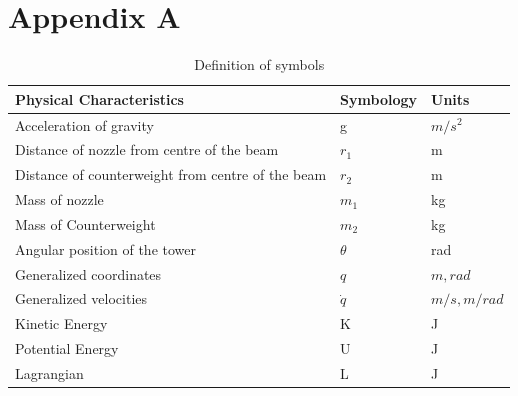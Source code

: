\documentclass{UoNMCHA}
\numberwithin{equation}{section}
\begin{document}
\newpage
\newpage
\appendix

\section{Appendix A}

\begin{table}[H] \label{tab:physical Characteristics}
	\caption{Definition of symbols}
	\begin{tabular}{lll}
		\textbf{Physical Characteristics}                 & \textbf{Symbology} & \textbf{Units}                              \\ \hline
		Acceleration of gravity                           & g                  & $m/s^2 $     \\
		Distance of nozzle from centre of the beam        &$ r_1 $              & m                                           \\
		Distance of counterweight from centre of the beam & $r_2$               & m                                           \\
		Mass of nozzle                                    & $m_1$               & kg                                          \\
		Mass of Counterweight                             & $m_2 $              & kg                                          \\
		Angular position of the tower                     & $\theta$                  & rad                                         \\
		Generalized coordinates                           & $q$                  & $m,rad$                                     \\
		Generalized velocities                            & $\dot{q}$          & $m/s,m/rad$ \\
		Kinetic Energy                                    & K                  & J                                           \\
		Potential Energy                                  & U                  & J                                           \\
		Lagrangian                                        & L                  & J                                          
	\end{tabular}
\end{table}
\end{document}
